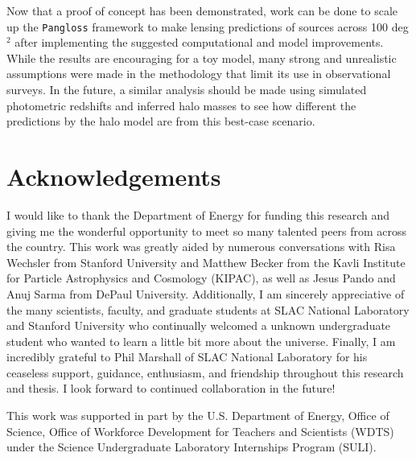 \documentclass[%
 reprint,
 amsmath,amssymb,
 aps,nofootinbib
]{revtex4-1}
\begin{document}
Now that a proof of concept has been demonstrated, work can be done to scale up the \texttt{Pangloss} framework to make lensing predictions of sources across 100 deg$^2$ after implementing the suggested computational and model improvements. While the results are encouraging for a toy model, many strong and unrealistic assumptions were made in the methodology that limit its use in observational surveys. In the future, a similar analysis should be made using simulated photometric redshifts and inferred halo masses to see how different the predictions by the halo model are from this best-case scenario.

\vspace{0.04 in}

\section{Acknowledgements}

I would like to thank the Department of Energy for funding this research and giving me the wonderful opportunity to meet so many talented peers from across the country. This work was greatly aided by numerous conversations with Risa Wechsler from Stanford University and Matthew Becker from the Kavli Institute for Particle Astrophysics and Cosmology (KIPAC), as well as Jesus Pando and Anuj Sarma from DePaul University. Additionally, I am sincerely appreciative of the many scientists, faculty, and graduate students at SLAC National Laboratory and Stanford University who continually welcomed a unknown undergraduate student who wanted to learn a little bit more about the universe. Finally, I am incredibly grateful to Phil Marshall of SLAC National Laboratory for his ceaseless support, guidance, enthusiasm, and friendship throughout this research and thesis. I look forward to continued collaboration in the future!

This work was supported in part by the U.S. Department of Energy, Office of Science, Office of Workforce Development for Teachers and Scientists (WDTS) under the Science Undergraduate Laboratory Internships Program (SULI).


\onecolumngrid

\vspace{0.25 in}
\end{document}
